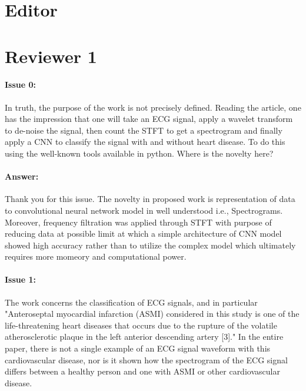 \documentclass{article}
\begin{document}
\section{Editor}

\section{Reviewer 1}

\paragraph{Issue 0:}
\begin{displayquote}
In truth, the purpose of the work is not precisely defined. Reading the article, one has the impression that one will take an ECG signal, apply a wavelet transform to de-noise the signal, then count the STFT to get a spectrogram and finally apply a CNN to classify the signal with and without heart disease. To do this using the well-known tools available in python. Where is the novelty here?
\end{displayquote}

\paragraph{Answer:}
Thank you for this issue. The novelty in proposed work is representation of data to convolutional neural network model in well understood i.e., Spectrograms. Moreover,  frequency filtration was applied through STFT with purpose of reducing data at possible limit at which a simple architecture of CNN model showed high accuracy rather than to utilize the complex model which ultimately requires more momeory and computational power. 

\paragraph{Issue 1:}
\begin{displayquote}
The work concerns the classification of ECG signals, and in particular "Anteroseptal myocardial infarction (ASMI) considered in this study is one of the life-threatening heart diseases that occurs due to the rupture of the volatile atherosclerotic plaque in the left anterior descending artery [3]." In the entire paper, there is not a single example of an ECG signal waveform with this cardiovascular disease, nor is it shown how the spectrogram of the ECG signal differs between a healthy person and one with ASMI or other cardiovascular disease. 
\end{displayquote}
\end{document}
